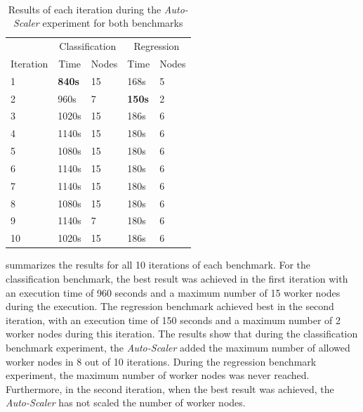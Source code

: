 \paragraph{}
\begin{table}[ht]
\centering
\begin{tabular}{@{}l|ll|ll@{}}
\toprule
                               & \multicolumn{2}{c|}{Classification}                   & \multicolumn{2}{c}{Regression}                       \\
\multicolumn{1}{c|}{Iteration} & \multicolumn{1}{c}{Time} & \multicolumn{1}{c|}{Nodes} & \multicolumn{1}{c}{Time} & \multicolumn{1}{c}{Nodes} \\ \midrule
1  & \textbf{840s} & 15 & 168s          & 5 \\
2  & 960s          & 7  & \textbf{150s} & 2 \\
3  & 1020s         & 15 & 186s          & 6 \\
4  & 1140s         & 15 & 180s          & 6 \\
5  & 1080s         & 15 & 180s          & 6 \\
6  & 1140s         & 15 & 180s          & 6 \\
7  & 1140s         & 15 & 180s          & 6 \\
8  & 1080s         & 15 & 180s          & 6 \\
9  & 1140s         & 7  & 180s          & 6 \\
10 & 1020s         & 15 & 186s          & 6 \\ \bottomrule
\end{tabular}
\caption{Results of each iteration during the \textit{Auto-Scaler} experiment for both benchmarks}
\label{table:07_auto-scaler_iterations}
\end{table}
 summarizes the results for all 10 iterations of each benchmark.
For the classification benchmark, the best result was achieved in the first iteration with an execution time of 960 seconds and a maximum number of 15 worker nodes during the execution.
The regression benchmark achieved best in the second iteration, with an execution time of 150 seconds and a maximum number of 2 worker nodes during this iteration.
The results show that during the classification benchmark experiment, the \textit{Auto-Scaler} added the maximum number of allowed worker nodes in 8 out of 10 iterations. During the regression benchmark experiment, the maximum number of worker nodes was never reached. Furthermore, in the second iteration, when the best result was achieved, the \textit{Auto-Scaler} has not scaled the number of worker nodes.

